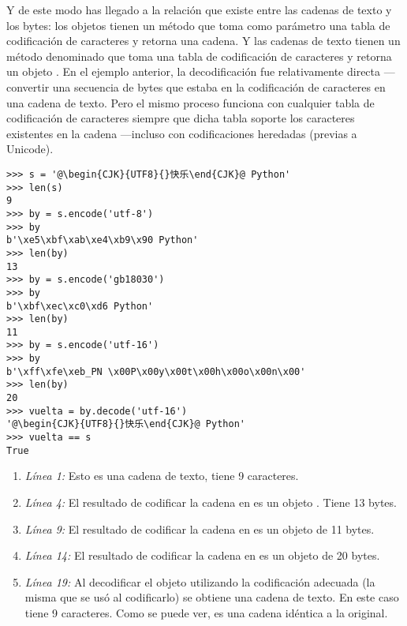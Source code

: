 Y de este modo has llegado a la relación que existe entre las cadenas de texto y los bytes: los objetos  tienen un método  que toma como parámetro una tabla de codificación de caracteres y retorna una cadena. Y las cadenas de texto tienen un método denominado  que toma una tabla de codificación de caracteres y retorna un objeto . En el ejemplo anterior, la decodificación fue relativamente directa ---convertir una secuencia de bytes que estaba en la codificación de caracteres  en una cadena de texto. Pero el mismo proceso funciona con cualquier tabla de codificación de caracteres siempre que dicha tabla soporte los caracteres existentes en la cadena ---incluso con codificaciones heredadas (previas a Unicode).


\noindent\begin{minipage}{\textwidth}
\begin{lstlisting}[mathescape=True,escapeinside=@@]
>>> s = '@\begin{CJK}{UTF8}{}快乐\end{CJK}@ Python'
>>> len(s)
9
>>> by = s.encode('utf-8')
>>> by
b'\xe5\xbf\xab\xe4\xb9\x90 Python'
>>> len(by)
13
>>> by = s.encode('gb18030')
>>> by
b'\xbf\xec\xc0\xd6 Python'
>>> len(by)
11
>>> by = s.encode('utf-16')
>>> by
b'\xff\xfe\xeb_PN \x00P\x00y\x00t\x00h\x00o\x00n\x00'
>>> len(by)
20
>>> vuelta = by.decode('utf-16')
'@\begin{CJK}{UTF8}{}快乐\end{CJK}@ Python'
>>> vuelta == s
True
\end{lstlisting}
\end{minipage}

\begin{enumerate}

\item \emph{Línea 1:} Esto es una cadena de texto, tiene 9 caracteres.

\item \emph{Línea 4:} El resultado de codificar la cadena en  es un objeto . Tiene 13 bytes. 

\item \emph{Línea 9:} El resultado de codificar la cadena en  es un objeto  de 11 bytes.

\item \emph{Línea 14:} El resultado de codificar la cadena en  es un objeto  de 20 bytes.

\item \emph{Línea 19:} Al decodificar el objeto  utilizando la codificación adecuada (la misma que se usó al codificarlo) se obtiene una cadena de texto. En este caso tiene 9 caracteres. Como se puede ver, es una cadena idéntica a la original.

\end{enumerate}

